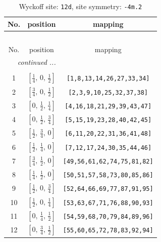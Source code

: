 \documentclass[fleqn,8pt]{jsarticle}
\begin{document}
\begin{longtable}{ccc}
\caption{Wyckoff site: {\tt 12d}, site symmetry: {\tt -4m.2}}
 \\
 \hline \hline
No. & position & mapping \\ \hline \endfirsthead

\multicolumn{2}{l}{\tablename\ \thetable{}} \\
 \hline \hline
No. & position & mapping \\ \hline \endhead

 \hline \hline
\multicolumn{2}{r}{\footnotesize\it continued ...} \\ \endfoot

 \hline \hline
\multicolumn{2}{r}{} \\ \endlastfoot

1 & $\left[ \frac{1}{4},\, 0,\, \frac{1}{2} \right]$ & {\tt [1,8,13,14,26,27,33,34]} \\ \hline
2 & $\left[ \frac{3}{4},\, 0,\, \frac{1}{2} \right]$ & {\tt [2,3,9,10,25,32,37,38]} \\ \hline
3 & $\left[ 0,\, \frac{1}{2},\, \frac{1}{4} \right]$ & {\tt [4,16,18,21,29,39,43,47]} \\ \hline
4 & $\left[ 0,\, \frac{1}{2},\, \frac{3}{4} \right]$ & {\tt [5,15,19,23,28,40,42,45]} \\ \hline
5 & $\left[ \frac{1}{2},\, \frac{3}{4},\, 0 \right]$ & {\tt [6,11,20,22,31,36,41,48]} \\ \hline
6 & $\left[ \frac{1}{2},\, \frac{1}{4},\, 0 \right]$ & {\tt [7,12,17,24,30,35,44,46]} \\ \hline
7 & $\left[ \frac{3}{4},\, \frac{1}{2},\, 0 \right]$ & {\tt [49,56,61,62,74,75,81,82]} \\ \hline
8 & $\left[ \frac{1}{4},\, \frac{1}{2},\, 0 \right]$ & {\tt [50,51,57,58,73,80,85,86]} \\ \hline
9 & $\left[ \frac{1}{2},\, 0,\, \frac{3}{4} \right]$ & {\tt [52,64,66,69,77,87,91,95]} \\ \hline
10 & $\left[ \frac{1}{2},\, 0,\, \frac{1}{4} \right]$ & {\tt [53,63,67,71,76,88,90,93]} \\ \hline
11 & $\left[ 0,\, \frac{1}{4},\, \frac{1}{2} \right]$ & {\tt [54,59,68,70,79,84,89,96]} \\ \hline
12 & $\left[ 0,\, \frac{3}{4},\, \frac{1}{2} \right]$ & {\tt [55,60,65,72,78,83,92,94]} \\
\end{longtable}
\renewcommand{\arraystretch}{1.2}
\end{document}
